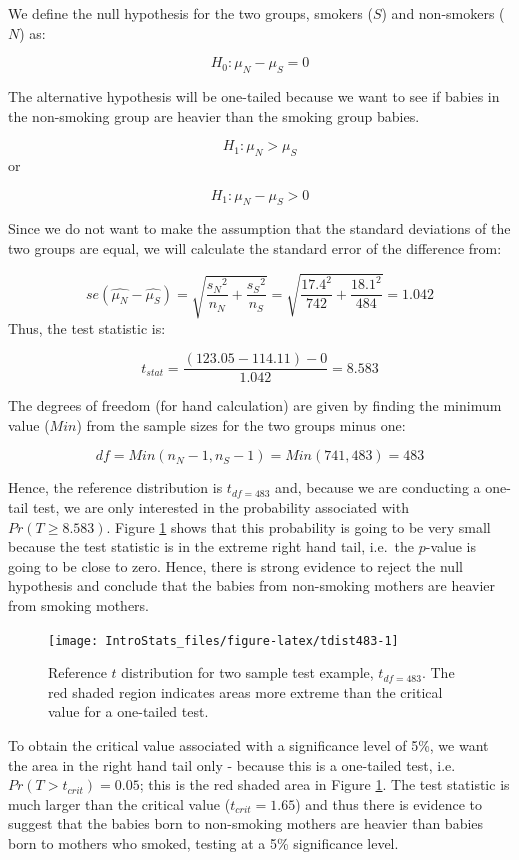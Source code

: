 \documentclass[
  oneside]{krantz}
\begin{document}
We define the null hypothesis for the two groups, smokers (\(S\)) and non-smokers (\(N\)) as:

\[H_0: \mu_N - \mu_S = 0\]

The alternative hypothesis will be one-tailed because we want to see if babies in the non-smoking group are heavier than the smoking group babies.

\[H_1: \mu_N > \mu_S\]
or

\[H_1: \mu_N - \mu_S > 0\]

Since we do not want to make the assumption that the standard deviations of the two groups are equal, we will calculate the standard error of the difference from:

\[se(\hat{\mu_N} - \hat{\mu_S})= \sqrt{\frac{{s_N}^2}{{n_N}} + \frac{{s_S}^2}{{n_S}}} = \sqrt{\frac{17.4^2}{742} + \frac{18.1^2}{484}} = 1.042\]
Thus, the test statistic is:

\[t_{stat} = \frac{(123.05 - 114.11) - 0}{1.042} = 8.583\]

The degrees of freedom (for hand calculation) are given by finding the minimum value (\(Min\)) from the sample sizes for the two groups minus one:

\[df = Min(n_N-1, n_S-1) = Min(741, 483) = 483\]

Hence, the reference distribution is \(t_{df=483}\) and, because we are conducting a one-tail test, we are only interested in the probability associated with \(Pr(T \ge 8.583)\). Figure \ref{fig:tdist483} shows that this probability is going to be very small because the test statistic is in the extreme right hand tail, i.e.~the \(p\)-value is going to be close to zero. Hence, there is strong evidence to reject the null hypothesis and conclude that the babies from non-smoking mothers are heavier from smoking mothers.

\begin{figure}[!htb]

{\centering \texttt{[image: IntroStats\_files/figure-latex/tdist483-1]} 

}

\caption{Reference $t$ distribution for two sample test example, $t_{df=483}$. The red shaded region indicates areas more extreme than the critical value for a one-tailed test.}\label{fig:tdist483}
\end{figure}

To obtain the critical value associated with a significance level of 5\%, we want the area in the right hand tail only - because this is a one-tailed test, i.e.~\(Pr(T > t_{crit}) = 0.05\); this is the red shaded area in Figure \ref{fig:tdist483}. The test statistic is much larger than the critical value (\(t_{crit}=1.65\)) and thus there is evidence to suggest that the babies born to non-smoking mothers are heavier than babies born to mothers who smoked, testing at a 5\% significance level.
\end{document}
